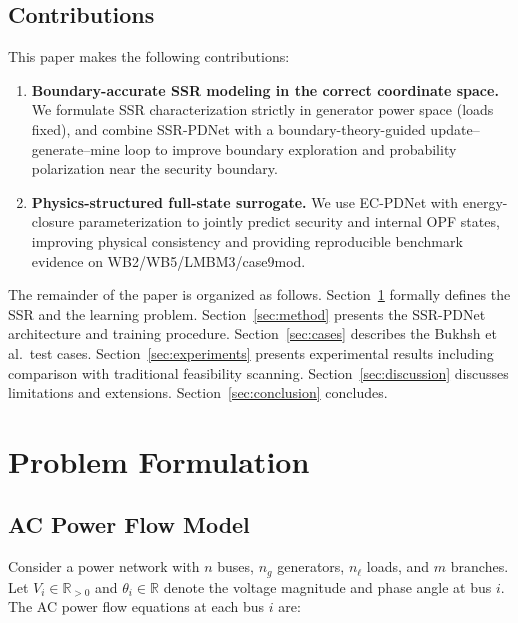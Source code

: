 \documentclass[journal]{IEEEtran}
\newcommand{\R}{\mathbb{R}}
\begin{document}
\subsection{Contributions}

This paper makes the following contributions:

\begin{enumerate}
  \item \textbf{Boundary-accurate SSR modeling in the correct coordinate space.} We formulate SSR characterization strictly in generator power space (loads fixed), and combine SSR-PDNet with a boundary-theory-guided update--generate--mine loop to improve boundary exploration and probability polarization near the security boundary.

  \item \textbf{Physics-structured full-state surrogate.} We use EC-PDNet with energy-closure parameterization to jointly predict security and internal OPF states, improving physical consistency and providing reproducible benchmark evidence on WB2/WB5/LMBM3/case9mod.
\end{enumerate}

The remainder of the paper is organized as follows.
Section~\ref{sec:problem} formally defines the SSR and the learning problem.
Section~\ref{sec:method} presents the SSR-PDNet architecture and training
procedure. Section~\ref{sec:cases} describes the Bukhsh et al.\ test cases.
Section~\ref{sec:experiments} presents experimental results including comparison
with traditional feasibility scanning.
Section~\ref{sec:discussion} discusses limitations and extensions.
Section~\ref{sec:conclusion} concludes.

\section{Problem Formulation}
\label{sec:problem}

\subsection{AC Power Flow Model}

Consider a power network with $n$ buses, $n_g$ generators, $n_\ell$ loads,
and $m$ branches. Let $V_i \in \R_{>0}$ and $\theta_i \in \R$ denote the
voltage magnitude and phase angle at bus $i$. The AC power flow equations at
each bus $i$ are:
\end{document}
